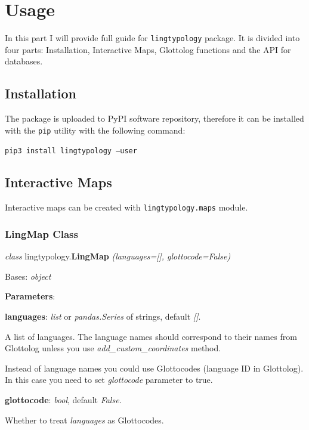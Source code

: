 \documentclass[a4paper,12pt]{article}
\begin{document}
\newpage

\section{Usage}
In this part I will provide full guide for \texttt{lingtypology} package. It is divided into four parts: Installation, Interactive Maps, Glottolog functions and the API for databases.

\subsection{Installation}
The package is uploaded to PyPI software repository, therefore it can be installed with the \texttt{pip} utility with the following command:

\texttt{pip3 install lingtypology --user}

\subsection{Interactive Maps}
Interactive maps can be created with \texttt{lingtypology.maps} module.

\subsubsection{LingMap Class}

\textit{class} lingtypology.\textbf{LingMap} \textit{(languages=[], glottocode=False)}

Bases: \textit{object}

\textbf{Parameters}:
\begin{itemize}
\begin{samepage}
 \item \textbf{languages}: \textit{list} or \textit{pandas.Series} of strings, default \textit{[]}.

 A list of languages. The language names should correspond to their names from Glottolog unless you use \textit{add\_custom\_coordinates} method.
 
 Instead of language names you could use Glottocodes (language ID in Glottolog). In this case you need to set \textit{glottocode} parameter to true.
 
 \item \textbf{glottocode}: \textit{bool}, default \textit{False}.
 
 Whether to treat \textit{languages} as Glottocodes.
 
\end{samepage}
\end{itemize}
\end{document}
